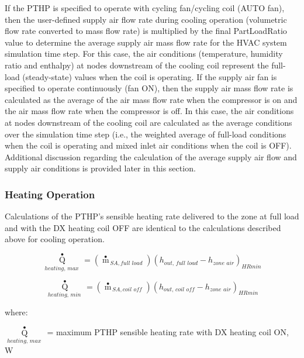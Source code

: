 If the PTHP is specified to operate with cycling fan/cycling coil (AUTO fan), then the user-defined supply air flow rate during cooling operation (volumetric flow rate converted to mass flow rate) is multiplied by the final PartLoadRatio value to determine the average supply air mass flow rate for the HVAC system simulation time step. For this case, the air conditions (temperature, humidity ratio and enthalpy) at nodes downstream of the cooling coil represent the full-load (steady-state) values when the coil is operating. If the supply air fan is specified to operate continuously (fan ON), then the supply air mass flow rate is calculated as the average of the air mass flow rate when the compressor is on and the air mass flow rate when the compressor is off. In this case, the air conditions at nodes downstream of the cooling coil are calculated as the average conditions over the simulation time step (i.e., the weighted average of full-load conditions when the coil is operating and mixed inlet air conditions when the coil is OFF). Additional discussion regarding the calculation of the average supply air flow and supply air conditions is provided later in this section.

\subsubsection{Heating Operation}\label{heating-operation-1-000}

Calculations of the PTHP's sensible heating rate delivered to the zone at full load and with the DX heating coil OFF are identical to the calculations described above for cooling operation.

\begin{equation}
{\mathop Q\limits^ \bullet_{heating,\,max\,}} = \left( {{{\mathop m\limits^ \bullet  }_{\,SA,full\,\,load}}} \right){\left( {{h_{out,\,full\,\,load}} - {h_{zone\,\,air}}} \right)_{HRmin}}
\end{equation}

\begin{equation}
{\mathop Q\limits^ \bullet_{heating,\,min\,}} = \left( {{{\mathop m\limits^ \bullet  }_{\,SA,coil\,\,off}}} \right){\left( {{h_{out,\,coil\,\,off}} - {h_{zone\,\,air}}} \right)_{HRmin}}
\end{equation}

where:

\({\mathop Q\limits^ \bullet_{heating,\,max\,}}\) = maximum PTHP sensible heating rate with DX heating coil ON, W

